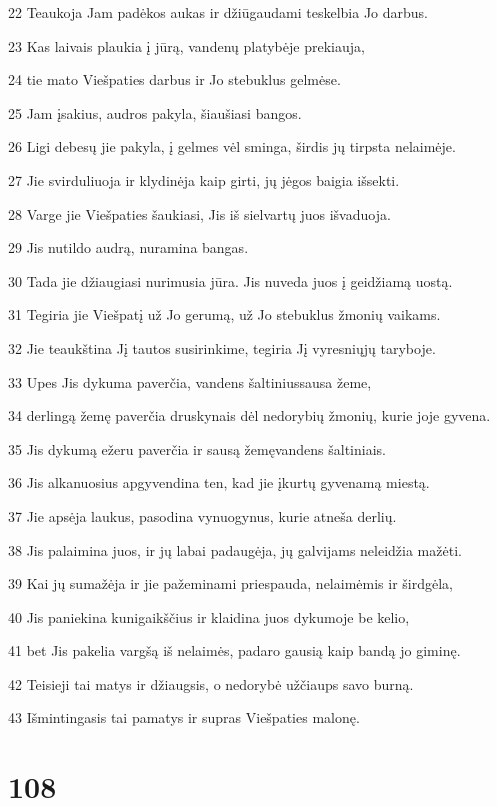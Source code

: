 \par 22 Teaukoja Jam padėkos aukas ir džiūgaudami teskelbia Jo darbus. 
\par 23 Kas laivais plaukia į jūrą, vandenų platybėje prekiauja, 
\par 24 tie mato Viešpaties darbus ir Jo stebuklus gelmėse. 
\par 25 Jam įsakius, audros pakyla, šiaušiasi bangos. 
\par 26 Ligi debesų jie pakyla, į gelmes vėl sminga, širdis jų tirpsta nelaimėje. 
\par 27 Jie svirduliuoja ir klydinėja kaip girti, jų jėgos baigia išsekti. 
\par 28 Varge jie Viešpaties šaukiasi, Jis iš sielvartų juos išvaduoja. 
\par 29 Jis nutildo audrą, nuramina bangas. 
\par 30 Tada jie džiaugiasi nurimusia jūra. Jis nuveda juos į geidžiamą uostą. 
\par 31 Tegiria jie Viešpatį už Jo gerumą, už Jo stebuklus žmonių vaikams. 
\par 32 Jie teaukština Jį tautos susirinkime, tegiria Jį vyresniųjų taryboje. 
\par 33 Upes Jis dykuma paverčia, vandens šaltinius­sausa žeme, 
\par 34 derlingą žemę paverčia druskynais dėl nedorybių žmonių, kurie joje gyvena. 
\par 35 Jis dykumą ežeru paverčia ir sausą žemę­vandens šaltiniais. 
\par 36 Jis alkanuosius apgyvendina ten, kad jie įkurtų gyvenamą miestą. 
\par 37 Jie apsėja laukus, pasodina vynuogynus, kurie atneša derlių. 
\par 38 Jis palaimina juos, ir jų labai padaugėja, jų galvijams neleidžia mažėti. 
\par 39 Kai jų sumažėja ir jie pažeminami priespauda, nelaimėmis ir širdgėla, 
\par 40 Jis paniekina kunigaikščius ir klaidina juos dykumoje be kelio, 
\par 41 bet Jis pakelia vargšą iš nelaimės, padaro gausią kaip bandą jo giminę. 
\par 42 Teisieji tai matys ir džiaugsis, o nedorybė užčiaups savo burną. 
\par 43 Išmintingasis tai pamatys ir supras Viešpaties malonę.


\chapter{108}


